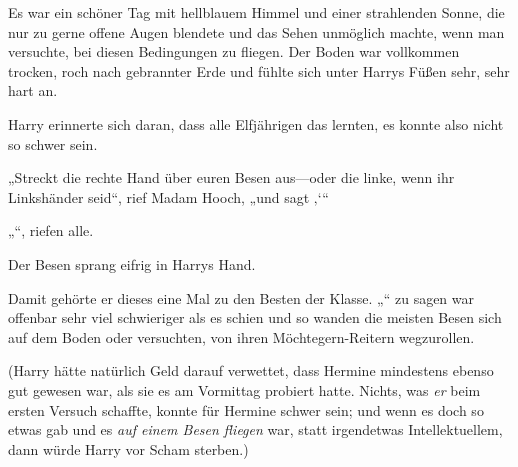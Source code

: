 Es war ein schöner Tag mit hellblauem Himmel und einer strahlenden Sonne, die nur zu gerne offene Augen blendete und das Sehen unmöglich machte, wenn man versuchte, bei diesen Bedingungen zu fliegen. Der Boden war vollkommen trocken, roch nach gebrannter Erde und fühlte sich unter Harrys Füßen sehr, sehr hart an.

Harry erinnerte sich daran, dass alle Elfjährigen das lernten, es konnte also nicht so schwer sein.

„Streckt die rechte Hand über euren Besen aus—oder die linke, wenn ihr Linkshänder seid“, rief Madam Hooch, „und sagt ‚‘“

„“, riefen alle.

Der Besen sprang eifrig in Harrys Hand.

Damit gehörte er dieses eine Mal zu den Besten der Klasse. „“ zu sagen war offenbar sehr viel schwieriger als es schien und so wanden die meisten Besen sich auf dem Boden oder versuchten, von ihren Möchtegern-Reitern wegzurollen.

(Harry hätte natürlich Geld darauf verwettet, dass Hermine mindestens ebenso gut gewesen war, als sie es am Vormittag probiert hatte. Nichts, was \emph{er} beim ersten Versuch schaffte, konnte für Hermine schwer sein; und wenn es doch so etwas gab und es \emph{auf einem Besen fliegen} war, statt irgendetwas Intellektuellem, dann würde Harry vor Scham sterben.)

